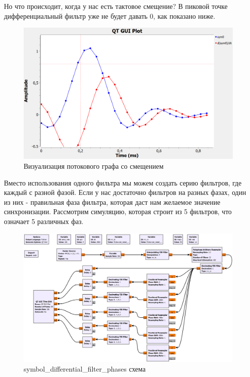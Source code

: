 \documentclass[a4paper,12pt]{report}
\begin{document}
Но что происходит, когда у нас есть тактовое смещение? В пиковой точке дифференциальный фильтр уже не будет давать 0, как показано ниже.

\begin{figure}[H]
        \centering
        \includegraphics[width=1.0\textwidth]{13.png}
        \caption{Визуализация потокового графа со смещением}
        \label{fig:lab12_fig3_7}
\end{figure}

Вместо использования одного фильтра мы можем создать серию фильтров, где каждый с разной фазой. Если у нас достаточно фильтров на разных фазах, один из них - правильная фаза фильтра, которая даст нам желаемое значение синхронизации. Рассмотрим симуляцию, которая строит из 5 фильтров, что означает 5 различных фаз.

\begin{figure}[H]
        \centering
        \includegraphics[width=1.0\textwidth]{14.png}
        \caption{symbol\_differential\_filter\_phases схема}
        \label{fig:lab12_fig3_8}
\end{figure}
\end{document}

